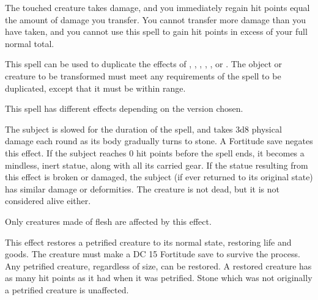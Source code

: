 \begin{spelleffect}
  The touched creature takes damage, and you immediately regain hit points equal the amount of damage you transfer. You cannot transfer more damage than you have taken, and you cannot use this spell to gain hit points in excess of your full normal total.
\end{spelleffect}

\spellrng{\rngmed}
\begin{spelleffect}
  This spell can be used to duplicate the effects of , , , , , or . The object or creature to be transformed must meet any requirements of the spell to be duplicated, except that it must be within \rngmed range.
\end{spelleffect}

\spellrng{\rngmed}
\begin{spelleffect}
  This spell has different effects depending on the version chosen.
  \par {} The subject is slowed for the duration of the spell, and takes 3d8 physical damage each round as its body gradually turns to stone. A Fortitude save negates this effect. If the subject reaches 0 hit points before the spell ends, it becomes a mindless, inert statue, along with all its carried gear. If the statue resulting from this effect is broken or damaged, the subject (if ever returned to its original state) has similar damage or deformities. The creature is not dead, but it is not considered alive either.
  \par Only creatures made of flesh are affected by this effect.
  \par {} This effect restores a petrified creature to its normal state, restoring life and goods. The creature must make a DC 15 Fortitude save to survive the process. Any petrified creature, regardless of size, can be restored. A restored creature has as many hit points as it had when it was petrified. Stone which was not originally a petrified creature is unaffected.
\end{spelleffect}

